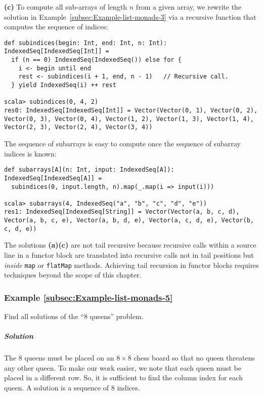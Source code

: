 \textbf{(c)} To compute all sub-arrays of length $n$ from a given
array, we rewrite the solution in Example~\ref{subsec:Example-list-monads-3}
via a recursive function that computes the sequence of indices:
\begin{lstlisting}
def subindices(begin: Int, end: Int, n: Int): IndexedSeq[IndexedSeq[Int]] =
  if (n == 0) IndexedSeq(IndexedSeq()) else for {
    i <- begin until end
    rest <- subindices(i + 1, end, n - 1)   // Recursive call.
  } yield IndexedSeq(i) ++ rest

scala> subindices(0, 4, 2)
res0: IndexedSeq[IndexedSeq[Int]] = Vector(Vector(0, 1), Vector(0, 2), Vector(0, 3), Vector(0, 4), Vector(1, 2), Vector(1, 3), Vector(1, 4), Vector(2, 3), Vector(2, 4), Vector(3, 4))
\end{lstlisting}
The sequence of subarrays is easy to compute once the sequence of
subarray indices is known: 
\begin{lstlisting}
def subarrays[A](n: Int, input: IndexedSeq[A]): IndexedSeq[IndexedSeq[A]] =
  subindices(0, input.length, n).map(_.map(i => input(i)))

scala> subarrays(4, IndexedSeq("a", "b", "c", "d", "e"))
res1: IndexedSeq[IndexedSeq[String]] = Vector(Vector(a, b, c, d), Vector(a, b, c, e), Vector(a, b, d, e), Vector(a, c, d, e), Vector(b, c, d, e))
\end{lstlisting}

The solutions \textbf{(a)}\textendash \textbf{(c)} are not tail recursive
because recursive calls within a source line in a functor block are
translated into recursive calls not in tail positions but \emph{inside}
\lstinline!map! or \lstinline!flatMap! methods. Achieving tail recursion
in functor blocks requires techniques beyond the scope of this chapter.

\subsubsection{Example \label{subsec:Example-list-monads-5}\ref{subsec:Example-list-monads-5}}

Find all solutions of the \textsf{``}$8$ queens\textsf{''} problem.

\subparagraph{Solution}

The $8$ queens must be placed on an $8\times8$ chess board so that
no queen threatens any other queen. To make our work easier, we note
that each queen must be placed in a different row. So, it is sufficient
to find the column index for each queen. A solution is a sequence
of $8$ indices.

